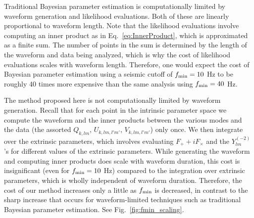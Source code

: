 Traditional Bayesian parameter estimation is computationally limited by waveform generation and
likelihood evaluations. Both of these are linearly proportional to waveform length. Note that the likelihood evaluations 
involve computing an inner product as in Eq.~\ref{eq:InnerProduct}, 
which is approximated as a finite sum. The number of points in the sum is determined by the length of the waveform 
and data being analyzed, which is why the cost of likelihood evaluations scales with waveform length.
Therefore, one would expect the cost of Bayesian parameter estimation using a seismic cutoff of $f_{\rm min} = 10$ Hz
to be roughly 40 times more expensive than the same analysis using $f_{\rm min} = 40$ Hz.

The method proposed here is not computationally limited by waveform generation. Recall that for each point
in the intrinsic parameter space we compute the waveform and the inner products between the various modes
and the data (the assorted $Q_{k,lm}$, $U_{k,lm,l'm'}$, $V_{k,lm,l'm'}$) only once. We then integrate over the 
extrinsic parameters, which involves evaluating $F_+ + i F_\times$ and the $Y^{(-2)}_{lm}$'s for 
different values of the extrinsic parameters.
While generating the waveform and computing inner products does scale with waveform duration, 
this cost is insignificant (even for $f_{\rm min}=10$ Hz) compared to the integration over extrinsic parameters,
which is wholly independent of waveform duration.
Therefore, the cost of our method increases only a little as $f_{\rm min}$ is decreased, in contrast to the sharp
increase that occurs for waveform-limited techniques such as traditional Bayesian parameter estimation.
See Fig.~\ref{fig:fmin_scaling}.




